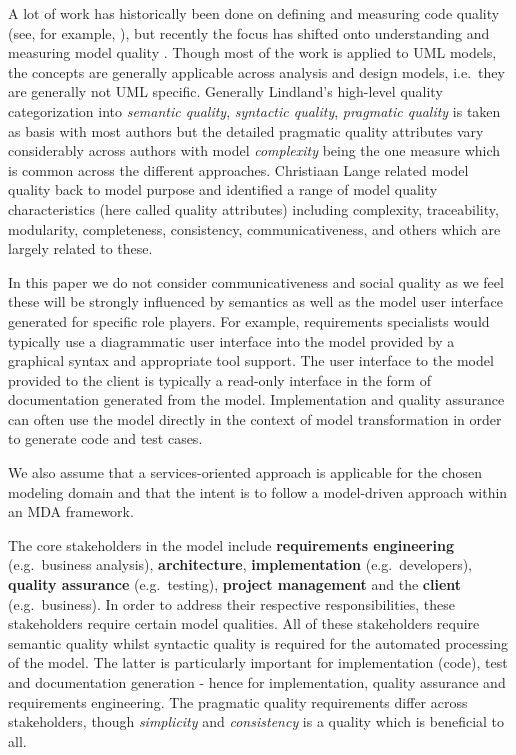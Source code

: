 A lot of work has historically been done on defining and measuring code quality (see, for example, \cite{boehm_barry_w._characteristics_1978}), but recently the focus has shifted onto understanding and measuring model quality \cite{lange_managing_2005,lange_improving_2006,shim_design_2008,qi_yu-dong_analysis_2010}. Though most of the work is applied to UML models, the concepts are generally applicable across analysis and design models, i.e.\ they are generally not UML specific. Generally Lindland's high-level quality categorization \cite{lindland_understanding_1994} into \emph{semantic quality}, \emph{syntactic quality}, \emph{pragmatic quality} is taken as basis with most authors but the detailed pragmatic quality attributes vary considerably across authors with model \emph{complexity} being the one measure which is common across the different approaches. Christiaan Lange  \cite{lange_christiaan_assessing_2007} related model quality back to model purpose and identified a range of model quality characteristics (here called quality attributes) including complexity, traceability, modularity, completeness, consistency, communicativeness, and others which are largely related to these.

In this paper we do not consider communicativeness and social quality as we feel these will be strongly influenced by semantics as well as the model user interface generated for specific role players. For example, requirements specialists would typically use a diagrammatic user interface into the model provided by a graphical syntax and appropriate tool support. The user interface to the model provided to the client is typically a read-only interface in the form of documentation generated from the model. Implementation and quality assurance can often use the model directly in the context of model transformation in order to generate code and test cases.

We also assume that a services-oriented approach is applicable for the chosen modeling domain and that the intent is to follow a model-driven approach within an MDA framework.

The core stakeholders in the model include {\bf requirements engineering} (e.g.\ business analysis), {\bf architecture}, {\bf implementation} (e.g.\ developers), {\bf quality assurance} (e.g.\ testing), {\bf project management} and the {\bf client} (e.g.\ business). In order to address their respective responsibilities, these stakeholders require certain model qualities. All of these stakeholders require semantic quality whilst syntactic quality is required for the automated processing of the model. The latter is particularly important for implementation (code), test and documentation generation - hence for implementation, quality assurance and requirements engineering. The pragmatic quality requirements differ across stakeholders, though \emph{simplicity} and \emph{consistency} is a quality which is beneficial to all.

